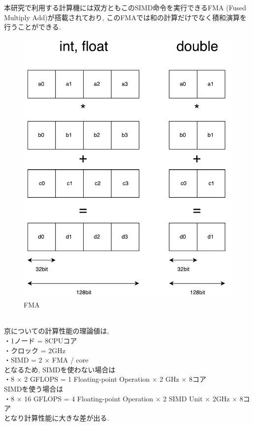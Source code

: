 本研究で利用する計算機には双方ともこのSIMD命令を実行できるFMA (Fused Multiply Add)が搭載されており,
このFMAでは和の計算だけでなく積和演算を行うことができる.\\
\begin{figure}[h!]
    \includegraphics[width=1.1\textwidth]{./images/FMA.pdf}
    \caption{FMA}
    \label{fig:fma-image}
\end{figure}~\\

京についての計算性能の理論値は, \\
・1ノード = 8CPUコア\\
・クロック = 2GHz\\
・SIMD = 2 × FMA / core\\
となるため, SIMDを使わない場合は\\
・8 × 2 GFLOPS = 1 Floating-point Operation × 2 GHz × 8コア\\
SIMDを使う場合は\\
・8 × 16 GFLOPS = 4 Floating-point Operation × 2 SIMD Unit × 2GHz × 8コア\\
となり計算性能に大きな差が出る.\\

